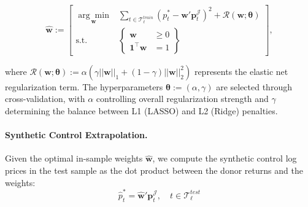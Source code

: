 $$
\widehat{\mathbf{w}} := \left[
\begin{array}{rlll}
\underset{\mathbf{w}}{\arg\min} & 
\sum_{t \in \mathcal{T}^{train}_{\ell}}
(
p_t^* - 
\mathbf{w}' \mathbf{p}_t^{\mathcal{J}}
)^2
+ 
\mathcal{R}(\mathbf{w}; \boldsymbol{\theta})
\\[1em]
\text{s.t.} &
    \left\{
    \begin{array}{rl}
    \mathbf{w} &\geq 0 \\
    \mathbf{1}^{\top} \mathbf{w} &= 1
    \end{array}
    \right\}
\end{array}
\right]
,
$$


where $\mathcal{R}(\mathbf{w}; \boldsymbol{\theta}) := \alpha(\gamma ||\mathbf{w}||_1 + (1-\gamma)||\mathbf{w}||_2^2)$ represents the elastic net regularization term. The hyperparameters $\boldsymbol{\theta} := (\alpha, \gamma)$ are selected through cross-validation, with $\alpha$ controlling overall regularization strength and $\gamma$ determining the balance between L1 (LASSO) and L2 (Ridge) penalties. 


\paragraph{Synthetic Control Extrapolation.}
 Given the optimal in-sample weights $\widehat{\mathbf{w}}$, we compute the synthetic control log prices in the test sample as the dot product between the donor returns and the weights:
$$
\widehat{p}_t^* = 
\widehat{\mathbf{w}}' \mathbf{p}_t^{\mathcal{J}} 
,  
\quad 
t\in\mathcal{T}^{test}_{\ell}
$$


